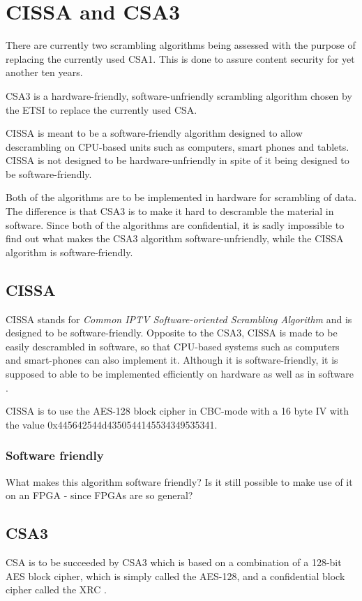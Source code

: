\chapter{CISSA and CSA3}
There are currently two scrambling algorithms being assessed with the purpose of 
replacing the currently used CSA1. This is done to assure content security for 
yet another ten years.

CSA3 is a hardware-friendly, software-unfriendly scrambling algorithm chosen by 
the ETSI to replace the currently used CSA. \citep[pp. 6--7]{DVB:2013}

CISSA is meant to be a software-friendly algorithm designed to allow descrambling
on CPU-based units such as computers, smart phones and tablets. CISSA is not 
designed to be hardware-unfriendly in spite of it being designed to be 
software-friendly. \citep[p. 9]{DVB:2013} 

Both of the algorithms are to be implemented in hardware for scrambling of data.
The difference is that CSA3 is to make it hard to descramble the material in 
software. Since both of the algorithms are confidential, it is sadly impossible 
to find out what makes the CSA3 algorithm software-unfriendly, while the CISSA 
algorithm is software-friendly. 

\section{CISSA}
CISSA stands for \emph{Common IPTV Software-oriented Scrambling Algorithm} and 
is designed to be software-friendly. Opposite to the CSA3, CISSA is made to be 
easily descrambled in software, so that CPU-based systems such as computers and 
smart-phones can also implement it.  Although it is software-friendly, it is 
supposed to able to be implemented efficiently on hardware as well as in 
software \citep[p. 9]{DVB:2013}.

CISSA is to use the AES-128 block cipher in CBC-mode with a 16 byte IV with the 
value 0x445642544d4350544145534349535341.

\subsection{Software friendly}
What makes this algorithm software friendly?
Is it still possible to make use of it on an FPGA - since FPGAs are so
general?

\section{CSA3}
CSA is to be succeeded by CSA3 which is based on a combination of a 128-bit 
AES block cipher, which is simply called the AES-128, and a confidential block 
cipher called the XRC \citep[p. 8]{DVB:2013}.

